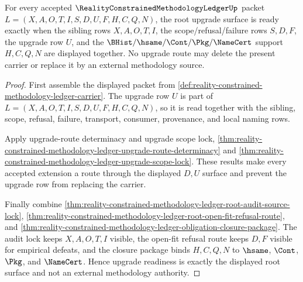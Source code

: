 \begin{theorem}
\label{thm:reality-constrained-methodology-ledger-root-upgrade-readiness}
For every accepted $\RealityConstrainedMethodologyLedgerUp$ packet
$L=(X,A,O,T,I,S,D,U,F,H,C,Q,N)$, the root upgrade surface is ready exactly when
the sibling rows $X,A,O,T,I$, the scope/refusal/failure rows $S,D,F$, the
upgrade row $U$, and the $\BHist/\hsame/\Cont/\Pkg/\NameCert$ support
$H,C,Q,N$ are displayed together. No upgrade route may delete the present
carrier or replace it by an external methodology source.
\end{theorem}
\begin{proof}
First assemble the displayed packet from
\autoref{def:reality-constrained-methodology-ledger-carrier}. The upgrade row
$U$ is part of $L=(X,A,O,T,I,S,D,U,F,H,C,Q,N)$, so it is read together with the
sibling, scope, refusal, failure, transport, consumer, provenance, and local
naming rows.

Apply upgrade-route determinacy and upgrade scope lock,
\autoref{thm:reality-constrained-methodology-ledger-upgrade-route-determinacy}
and
\autoref{thm:reality-constrained-methodology-ledger-upgrade-scope-lock}. These
results make every accepted extension a route through the displayed $D,U$
surface and prevent the upgrade row from replacing the carrier.

Finally combine
\autoref{thm:reality-constrained-methodology-ledger-root-audit-source-lock},
\autoref{thm:reality-constrained-methodology-ledger-root-open-fit-refusal-route},
and
\autoref{thm:reality-constrained-methodology-ledger-obligation-closure-package}.
The audit lock keeps $X,A,O,T,I$ visible, the open-fit refusal route keeps
$D,F$ visible for empirical defeats, and the closure package binds $H,C,Q,N$ to
$\hsame$, $\Cont$, $\Pkg$, and $\NameCert$. Hence upgrade readiness is exactly
the displayed root surface and not an external methodology authority.
\end{proof}

